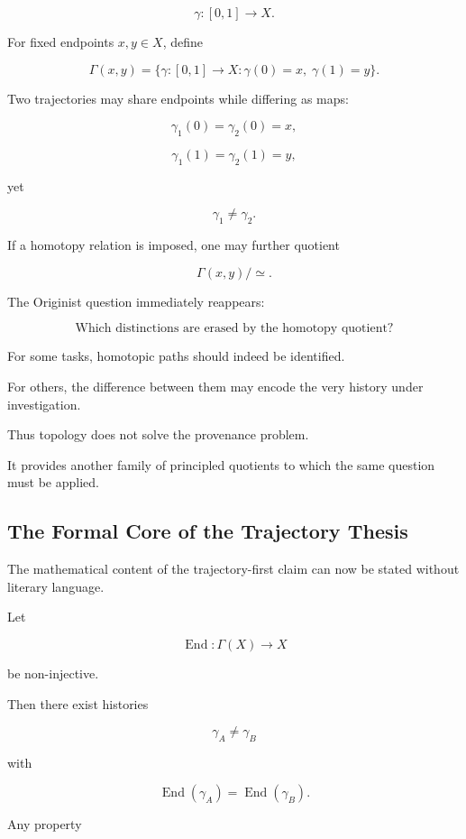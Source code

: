 \documentclass[
  11pt,
  a4paper,
  DIV=12,
  BCOR=0mm,
  parskip=half-
]{scrartcl}
\newcommand{\End}{\operatorname{End}}
\theoremstyle{definition}
\theoremstyle{plain}
\theoremstyle{remark}
\begin{document}
\[
  \gamma:[0,1]\to X.
\]

For fixed endpoints \(x,y\in X\), define

\[
  \Gamma(x,y)
  =
  \{
    \gamma:[0,1]\to X
    :
    \gamma(0)=x,\;
    \gamma(1)=y
  \}.
\]

Two trajectories may share endpoints while differing as maps:

\[
  \gamma_1(0)=\gamma_2(0)=x,
\]

\[
  \gamma_1(1)=\gamma_2(1)=y,
\]

yet

\[
  \gamma_1\neq\gamma_2.
\]

If a homotopy relation is imposed, one may further quotient

\[
  \Gamma(x,y)/{\simeq}.
\]

The Originist question immediately reappears:

\[
  \text{Which distinctions are erased by the homotopy quotient?}
\]

For some tasks, homotopic paths should indeed be identified.

For others, the difference between them may encode the very history under
investigation.

Thus topology does not solve the provenance problem.

It provides another family of principled quotients to which the same question
must be applied.


\subsection{The Formal Core of the Trajectory Thesis}
\label{app:formal-core}

The mathematical content of the trajectory-first claim can now be stated
without literary language.

Let

\[
  \End:\Gamma(X)\to X
\]

be non-injective.

Then there exist histories

\[
  \gamma_A\neq\gamma_B
\]

with

\[
  \End(\gamma_A)=\End(\gamma_B).
\]

Any property
\end{document}

